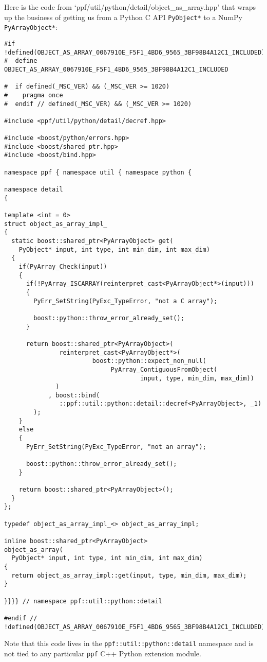 Here is the code from `ppf/util/python/detail/object\_as\_array.hpp'
that wraps up the business of getting us from a Python C API
\verb|PyObject*| to a NumPy \verb|PyArrayObject*|:
\begin{verbatim}
#if !defined(OBJECT_AS_ARRAY_0067910E_F5F1_4BD6_9565_3BF98B4A12C1_INCLUDED)
#  define OBJECT_AS_ARRAY_0067910E_F5F1_4BD6_9565_3BF98B4A12C1_INCLUDED

#  if defined(_MSC_VER) && (_MSC_VER >= 1020)
#    pragma once
#  endif // defined(_MSC_VER) && (_MSC_VER >= 1020)

#include <ppf/util/python/detail/decref.hpp>

#include <boost/python/errors.hpp>
#include <boost/shared_ptr.hpp>
#include <boost/bind.hpp>

namespace ppf { namespace util { namespace python {

namespace detail
{

template <int = 0>
struct object_as_array_impl_
{
  static boost::shared_ptr<PyArrayObject> get(
    PyObject* input, int type, int min_dim, int max_dim)
  {
    if(PyArray_Check(input))
    {
      if(!PyArray_ISCARRAY(reinterpret_cast<PyArrayObject*>(input)))
      {
        PyErr_SetString(PyExc_TypeError, "not a C array");
  
        boost::python::throw_error_already_set();
      }
  
      return boost::shared_ptr<PyArrayObject>(
               reinterpret_cast<PyArrayObject*>(
                        boost::python::expect_non_null(
                             PyArray_ContiguousFromObject(
                                     input, type, min_dim, max_dim))
              )
            , boost::bind(
               ::ppf::util::python::detail::decref<PyArrayObject>, _1)
        );
    }
    else
    {
      PyErr_SetString(PyExc_TypeError, "not an array");
  
      boost::python::throw_error_already_set();
    }
  
    return boost::shared_ptr<PyArrayObject>();
  }
};

typedef object_as_array_impl_<> object_as_array_impl;

inline boost::shared_ptr<PyArrayObject>
object_as_array(
  PyObject* input, int type, int min_dim, int max_dim)
{
  return object_as_array_impl::get(input, type, min_dim, max_dim);
}

}}}} // namespace ppf::util::python::detail

#endif // !defined(OBJECT_AS_ARRAY_0067910E_F5F1_4BD6_9565_3BF98B4A12C1_INCLUDED)
\end{verbatim}
Note that this code lives in the \verb|ppf::util::python::detail|
namespace and is not tied to any particular \verb|ppf| C++ Python
extension module.

